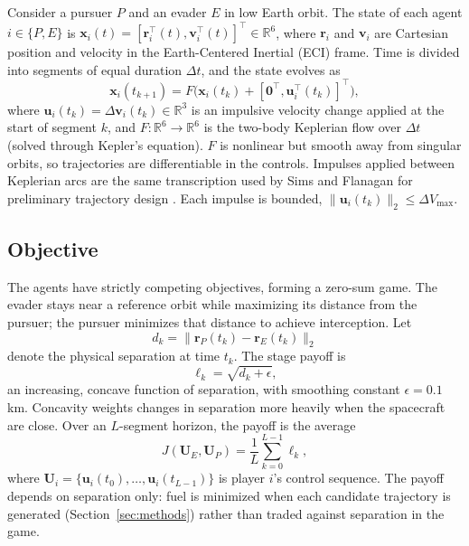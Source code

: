 \documentclass[letterpaper, 10 pt, conference]{ieeeconf}  %
\begin{document}
Consider a pursuer $P$ and an evader $E$ in low Earth orbit. The state of each agent $i \in \{P, E\}$ is $\mathbf{x}_i(t) = [\mathbf{r}_i^\top(t), \mathbf{v}_i^\top(t)]^\top \in \mathbb{R}^6$, where $\mathbf{r}_i$ and $\mathbf{v}_i$ are Cartesian position and velocity in the Earth-Centered Inertial (ECI) frame. Time is divided into segments of equal duration $\Delta t$, and the state evolves as
%
\begin{equation}
\mathbf{x}_i(t_{k+1}) = F\big(\mathbf{x}_i(t_k) + [\mathbf{0}^\top, \mathbf{u}_i^\top(t_k)]^\top\big),
\label{eq:state_eom}
\end{equation}
%
where $\mathbf{u}_i(t_k) = \Delta \mathbf{v}_i(t_k) \in \mathbb{R}^3$ is an impulsive velocity change applied at the start of segment $k$, and $F: \mathbb{R}^6 \to \mathbb{R}^6$ is the two-body Keplerian flow over $\Delta t$ (solved through Kepler's equation). $F$ is nonlinear but smooth away from singular orbits, so trajectories are differentiable in the controls. Impulses applied between Keplerian arcs are the same transcription used by Sims and Flanagan for preliminary trajectory design \cite{sims1997preliminary}. Each impulse is bounded, $\|\mathbf{u}_i(t_k)\|_2 \leq \Delta V_{\max}$.


\subsection{Objective}

The agents have strictly competing objectives, forming a zero-sum game. The evader stays near a reference orbit while maximizing its distance from the pursuer; the pursuer minimizes that distance to achieve interception. Let
%
\begin{equation}
d_k = \|\mathbf{r}_P(t_k) - \mathbf{r}_E(t_k)\|_2
\label{eq:distance}
\end{equation}
%
denote the physical separation at time $t_k$. The stage payoff is
%
\begin{equation}
\ell_k = \sqrt{d_k + \epsilon},
\label{eq:stage_payoff}
\end{equation}
%
an increasing, concave function of separation, with smoothing constant $\epsilon = 0.1$ km. Concavity weights changes in separation more heavily when the spacecraft are close. Over an $L$-segment horizon, the payoff is the average
%
\begin{equation}
J(\mathbf{U}_E, \mathbf{U}_P) = \frac{1}{L}\sum_{k=0}^{L-1} \ell_k ,
\label{eq:objective}
\end{equation}
%
where $\mathbf{U}_i = \{\mathbf{u}_i(t_0), \dots, \mathbf{u}_i(t_{L-1})\}$ is player $i$'s control sequence. The payoff depends on separation only: fuel is minimized when each candidate trajectory is generated (Section~\ref{sec:methods}) rather than traded against separation in the game.
\end{document}
